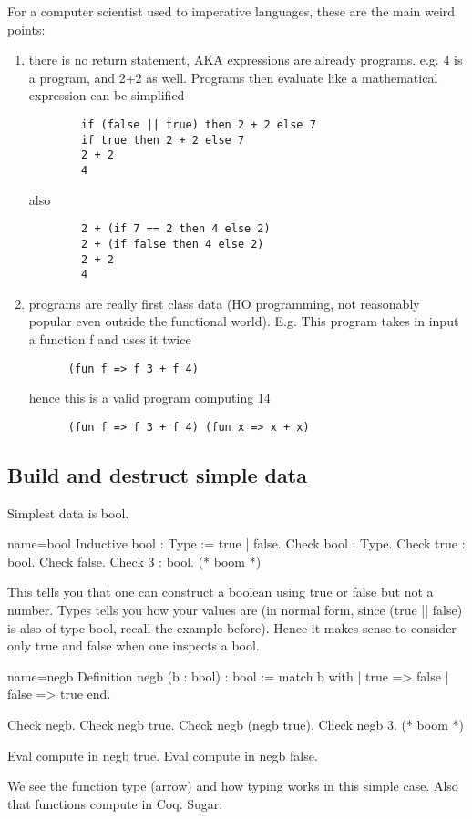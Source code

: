 For a computer scientist used to imperative languages, these are the main weird points:
\begin{enumerate}
\item there is no return statement, AKA expressions are already programs.  e.g.
	4 is a program, and 2+2 as well.  Programs then evaluate like a mathematical expression
	can be simplified
\begin{verbatim}
        if (false || true) then 2 + 2 else 7
        if true then 2 + 2 else 7
        2 + 2
        4
\end{verbatim}
also
\begin{verbatim}
        2 + (if 7 == 2 then 4 else 2)
        2 + (if false then 4 else 2)
        2 + 2
        4
\end{verbatim}
\item programs are really first class data (HO programming, not reasonably popular even outside
	the functional world). E.g. 
    This program takes in input a function f and uses it twice
\begin{verbatim}
      (fun f => f 3 + f 4)
\end{verbatim}
hence this is a valid program computing 14
\begin{verbatim}
      (fun f => f 3 + f 4) (fun x => x + x)
\end{verbatim}
\end{enumerate}


\subsection{Build and destruct simple data}
Simplest data is bool.

\begin{coq}{name=bool}{}
Inductive bool : Type := true | false.
Check bool : Type.
Check true : bool.
Check false.
Check 3 : bool. (* boom *)
\end{coq}

This tells you that one can construct a boolean using true or false but not a number.
Types tells you how your values are (in normal form, since (true || false) is also of type bool, recall the example before).
Hence it makes sense to consider only true and false when one inspects a bool.

\begin{coq}{name=negb}{}
Definition negb (b : bool) : bool :=
  match b with
  | true => false
  | false => true
  end.

Check negb.
Check negb true.
Check negb (negb true).
Check negb 3. (* boom *)

Eval compute in negb true.
Eval compute in negb false.
\end{coq}
We see the function type (arrow) and how typing works in this simple case.
Also that functions compute in Coq.
Sugar:

